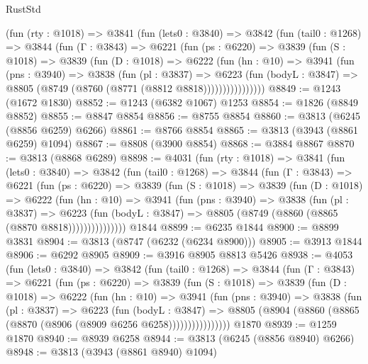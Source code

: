 \begin{lexlean}{RustStd}
\begin{coremodule}
{\begin{coremodule}
{{{{{{{{{{{{{{{{{{{{{{{{{{{{{{{{{{{      (fun (rty : @1018) =>
      @3841
        (fun (lets0 : @3840) =>
        @3842
          (fun (tail0 : @1268) =>
          @3844
            (fun (Γ : @3843) =>
            @6221
              (fun (ps : @6220) =>
              @3839
                (fun (S : @1018) =>
                @3839
                  (fun (D : @1018) =>
                  @6222
                    (fun (hn : @10) =>
                    @3941
                      (fun (pns : @3940) =>
                      @3838
                        (fun (pl : @3837) =>
                        @6223
                          (fun (bodyL : @3847) =>
                          @8805 (@8749 (@8760 (@8771 (@8812 @8818))))))))))))))))
@8849 := @1243 (@1672 @1830)
@8852 := @1243 (@6382 @1067) @1253
@8854 := @1826 (@8849 @8852)
@8855 := @8847 @8854
@8856 := @8755 @8854
@8860 := @3813 (@6245 (@8856 @6259) @6266)
@8861 := @8766 @8854
@8865 := @3813 (@3943 (@8861 @6259) @1094)
@8867 := @8808 (@3900 @8854)
@8868 := @3884 @8867
@8870 := @3813 (@8868 @6289)
@8898 := @4031
    (fun (rty : @1018) =>
    @3841
      (fun (lets0 : @3840) =>
      @3842
        (fun (tail0 : @1268) =>
        @3844
          (fun (Γ : @3843) =>
          @6221
            (fun (ps : @6220) =>
            @3839
              (fun (S : @1018) =>
              @3839
                (fun (D : @1018) =>
                @6222
                  (fun (hn : @10) =>
                  @3941
                    (fun (pns : @3940) =>
                    @3838
                      (fun (pl : @3837) =>
                      @6223
                        (fun (bodyL : @3847) =>
                        @8805 (@8749 (@8860 (@8865 (@8870 @8818)))))))))))))))
    @1844
@8899 := @6235 @1844
@8900 := @8899 @3831
@8904 := @3813 (@8747 (@6232 (@6234 @8900)))
@8905 := @3913 @1844
@8906 := @6292 @8905
@8909 := @3916 @8905 @8813 @5426
@8938 := @4053
    (fun (lets0 : @3840) =>
    @3842
      (fun (tail0 : @1268) =>
      @3844
        (fun (Γ : @3843) =>
        @6221
          (fun (ps : @6220) =>
          @3839
            (fun (S : @1018) =>
            @3839
              (fun (D : @1018) =>
              @6222
                (fun (hn : @10) =>
                @3941
                  (fun (pns : @3940) =>
                  @3838
                    (fun (pl : @3837) =>
                    @6223
                      (fun (bodyL : @3847) =>
                      @8805 (@8904 (@8860 (@8865 (@8870 (@8906 (@8909 @6256 @6258))))))))))))))))
    @1870
@8939 := @1259 @1870
@8940 := @8939 @6258
@8944 := @3813 (@6245 (@8856 @8940) @6266)
@8948 := @3813 (@3943 (@8861 @8940) @1094)
}}}}}}}}}}}}}}}}}}}}}}}}}}}}}}}}}}}
\end{coremodule}}
\end{coremodule}
\end{lexlean}

